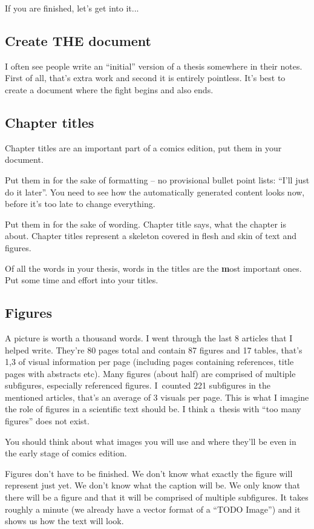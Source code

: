 If you are finished, let's get into it...

\subsection{Create THE document}

I often see people write an ``initial'' version of a thesis somewhere in their notes. First of all, that's extra work and second it is entirely pointless. It's best to create a document where the fight begins and also ends.

\subsection{Chapter titles}

Chapter titles are an important part of a comics edition, put them in your document.

Put them in for the sake of formatting -- no provisional bullet point lists: ``I'll just do it later''. You need to see how the automatically generated content looks now, before it's too late to change everything.

Put them in for the sake of wording. Chapter title says, what the chapter is about. Chapter titles represent a skeleton covered in flesh and skin of text and figures.

Of all the words in your thesis, words in the titles are the \textbf most important ones\rm. Put some time and effort into your titles.

\subsection{Figures}

A picture is worth a thousand words. I went through the last 8 articles that I helped write. They're 80 pages total and contain 87 figures and 17 tables, that's 1,3 of visual information per page (including pages containing references, title pages with abstracts etc). Many figures (about half) are comprised of multiple subfigures, especially referenced figures. I~counted 221 subfigures in the mentioned articles, that's an average of 3 visuals per page. This is what I imagine the role of figures in a scientific text should be. I think a~thesis with ``too many figures'' does not exist.

You should think about what images you will use and where they'll be even in the early stage of comics edition.

Figures don't have to be finished. We don't know what exactly the figure will represent just yet. We don't know what the caption will be. We only know that there will be a figure and that it will be comprised of multiple subfigures. It takes roughly a minute (we already have a vector format of a ``TODO Image'') and it shows us how the text will look.

